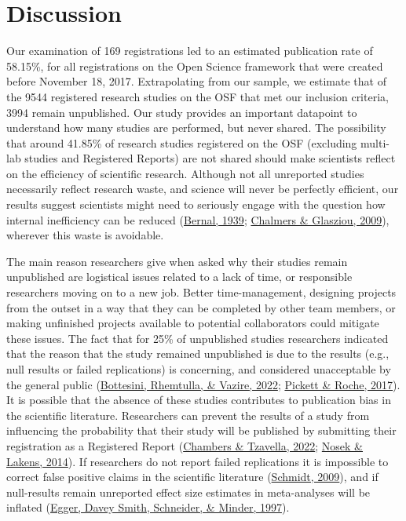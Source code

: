 \documentclass[
  ,jou, a4paper,floatsintext]{apa6}
\begin{document}
\hypertarget{discussion}{%
\section{Discussion}\label{discussion}}

Our examination of 169 registrations led to an estimated publication rate of 58.15\%, for all registrations on the Open Science framework that were created before November 18, 2017. Extrapolating from our sample, we estimate that of the 9544 registered research studies on the OSF that met our inclusion criteria, 3994 remain unpublished. Our study provides an important datapoint to understand how many studies are performed, but never shared. The possibility that around 41.85\% of research studies registered on the OSF (excluding multi-lab studies and Registered Reports) are not shared should make scientists reflect on the efficiency of scientific research. Although not all unreported studies necessarily reflect research waste, and science will never be perfectly efficient, our results suggest scientists might need to seriously engage with the question how internal inefficiency can be reduced (\protect\hyperlink{ref-bernal_social_1939}{Bernal, 1939}; \protect\hyperlink{ref-chalmers_avoidable_2009}{Chalmers \& Glasziou, 2009}), wherever this waste is avoidable.

The main reason researchers give when asked why their studies remain unpublished are logistical issues related to a lack of time, or responsible researchers moving on to a new job. Better time-management, designing projects from the outset in a way that they can be completed by other team members, or making unfinished projects available to potential collaborators could mitigate these issues. The fact that for 25\% of unpublished studies researchers indicated that the reason that the study remained unpublished is due to the results (e.g., null results or failed replications) is concerning, and considered unacceptable by the general public (\protect\hyperlink{ref-bottesini_what_2022}{Bottesini, Rhemtulla, \& Vazire, 2022}; \protect\hyperlink{ref-pickett_questionable_2017}{Pickett \& Roche, 2017}). It is possible that the absence of these studies contributes to publication bias in the scientific literature. Researchers can prevent the results of a study from influencing the probability that their study will be published by submitting their registration as a Registered Report (\protect\hyperlink{ref-chambers_past_2022}{Chambers \& Tzavella, 2022}; \protect\hyperlink{ref-nosek_registered_2014}{Nosek \& Lakens, 2014}). If researchers do not report failed replications it is impossible to correct false positive claims in the scientific literature (\protect\hyperlink{ref-schmidt_shall_2009}{Schmidt, 2009}), and if null-results remain unreported effect size estimates in meta-analyses will be inflated (\protect\hyperlink{ref-egger_bias_1997}{Egger, Davey Smith, Schneider, \& Minder, 1997}).
\end{document}
